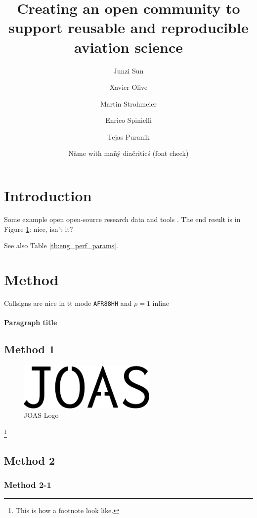 \documentclass[
  manuscript=data,  %
  year=20xx,
  volume=x,
]{joas}
\title{Creating an open community to support reusable and reproducible aviation science}
\author{Junzi Sun}
\affiliation{Joint first authors}
\author{Xavier Olive}
\affiliation{Joint first authors}
\author{Martin Strohmeier}
\affiliation{OpenSky Network, Switzerland}
\author{Enrico Spinielli}
\affiliation{EUROCONTROL, Belgium}
\author{Tejas Puranik}
\affiliation{NASA Ames Research Center, USA}
\author{Nàme with mañý diačriticś (font check)}
\affiliation{University of Syldavia}
\begin{document}
\begin{abstract}
  \blindtext
\end{abstract}


\section{Introduction}

\blindtext Some example open open-source research data \cite{schafer2014bringing} and tools \cite{olive2019traffic,sun2020openap}. The end result is in Figure \ref{fig:logo}: nice, isn't it?


\blindtext[2]

\blindtext See also Table \ref{tb:eng_perf_params}.


\section{Method}

Callsigns are nice in tt mode \texttt{AFR88HH} and $\rho = 1$ inline

\paragraph{Paragraph title} \blindtext

\subsection{Method 1}

\blindtext

\begin{figure}[ht!]
  \centering
  \includegraphics[width=0.6\textwidth]{joas-logo.pdf}
  \caption{JOAS Logo}
  \label{fig:logo}
\end{figure}

\blindtext\footnote{This is how a footnote look like.}

\subsection{Method 2}

\subsubsection{Method 2-1}
\end{document}
